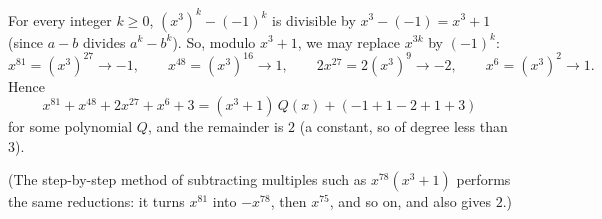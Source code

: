 For every integer $k\ge0$, $\left(x^3\right)^k-(-1)^k$ is divisible by $x^3-(-1)=x^3+1$ (since $a-b$ divides $a^k-b^k$). So, modulo $x^3+1$, we may replace $x^{3k}$ by $(-1)^k$:
\[x^{81}=\left(x^3\right)^{27}\to-1,\qquad x^{48}=\left(x^3\right)^{16}\to1,\qquad 2x^{27}=2\left(x^3\right)^9\to-2,\qquad x^6=\left(x^3\right)^2\to1 .\]
Hence
\[x^{81}+x^{48}+2x^{27}+x^6+3=(x^3+1)\,Q(x)+(-1+1-2+1+3)\]
for some polynomial $Q$, and the remainder is $\boxed{2}$ (a constant, so of degree less than $3$).

(The step-by-step method of subtracting multiples such as $x^{78}\left(x^3+1\right)$ performs the same reductions: it turns $x^{81}$ into $-x^{78}$, then $x^{75}$, and so on, and also gives $2$.)
